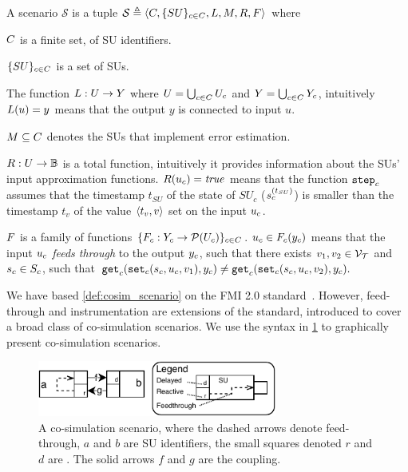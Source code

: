 \begin{definition}[Scenario]\label{def:cosim_scenario}
  A scenario $\mathcal{S}$ is a tuple $\mathcal{S} \triangleq  \left\langle C, \{SU\}_{c \in C}, L, M, R, F \right\rangle $ where 
  \begin{compactitem}
    \item $C$ is a finite set, of SU identifiers. 
    \item $\{SU\}_{c \in C}$ is a set of SUs.
    \item The function 
    $L : U \to Y$ where $U = \bigcup_{c \in C} U_{c}$ and $Y = \bigcup_{c \in C} Y_{c}$, intuitively 
    $L(u)=y$ means that the output $y$ is connected to input $u$.   
    \item $M \subseteq C$ denotes the SUs that implement error estimation. 
    \item
    $R : U \to \mathbb{B}$ is a total function, intuitively it provides information about the SUs' input approximation functions.
    $R(u_{c}) = \mathit{true}$ means that the function $\mathtt{step}_{c}$ assumes that the timestamp $t_{SU}$ of the state of $SU_c$ ($s_{c}^{(t_{SU})}$) is smaller than the timestamp $t_v$ of the value $ \left\langle t_v,v \right\rangle $ set on the input $u_{c}$.
    \item $F$ is a family of functions $\{F_{c} : Y_{c} \to \mathcal{P}(U_{c})\}_{c \in C}$.
    $u_{c} \in F_{c}(y_{c})$ means that the input $u_{c}$ \emph{feeds through} to the output $y_{c}$, such that there exists $v_1, v_2 \in \mathcal{V_{T}}$ and $s_{c} \in S_{c}$, such that
    $\mathtt{get}_{c} (\mathtt{set}_{c}(s_{c}, u_{c}, v_1), y_{c}) \neq \mathtt{get}_{c} (\mathtt{set}_{c}(s_{c}, u_{c}, v_2), y_{c}).$
  \end{compactitem}
\end{definition}

We have based \cref{def:cosim_scenario} on the FMI 2.0 standard~\cite{FMI2014}. 
However, feed-through and instrumentation are extensions of the standard, introduced to cover a broad class of co-simulation scenarios.
We use the syntax in \cref{fig:simpleexample} to graphically present co-simulation scenarios.

\begin{figure}[htb]
  \centering
  \includegraphics[width=0.7\textwidth]{images/simple_example.pdf}
  \caption{A co-simulation scenario, where the dashed arrows denote feed-through, $a$ and $b$ are SU identifiers, the small squares denoted $r$ and $d$ are .
  The solid arrows $f$ and $g$ are the coupling.}
  \label{fig:simpleexample}  
\end{figure}

